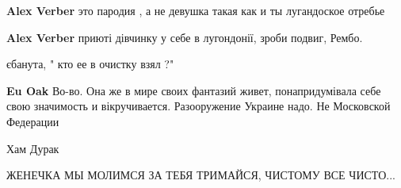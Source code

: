 \begin{itemize}
\begin{itemize}
\textbf{Alex Verber} это пародия , а не девушка такая как и ты лугандоское отребье

 
\textbf{Alex Verber} приюті дівчинку у себе в лугондонії, зроби подвиг, Рембо.
\end{itemize}

 
єбанута, " кто ее в очистку взял ?"

\begin{itemize}
 
\textbf{Eu Oak} Во-во. Она же в мире своих фантазий живет, понапридумівала себе
свою значимость и вікручивается. Разооружение Украине надо. Не Московской
Федерации

 
Хам
Дурак
\end{itemize}

 
ЖЕНЕЧКА МЫ МОЛИМСЯ ЗА ТЕБЯ ТРИМАЙСЯ, ЧИСТОМУ ВСЕ ЧИСТО...

 


\end{itemize}
